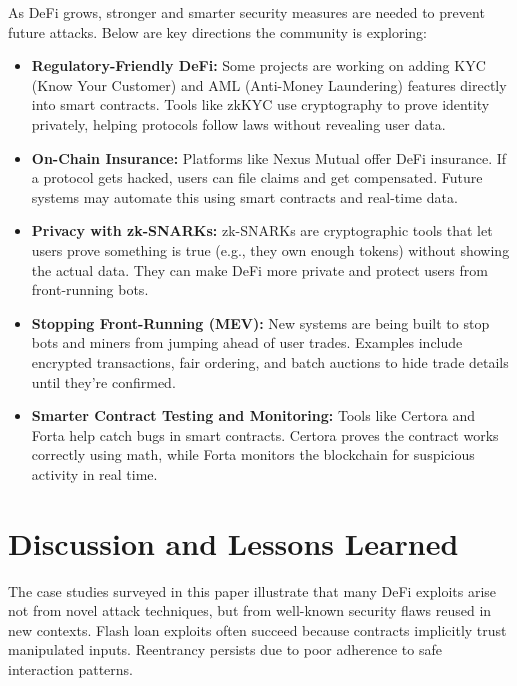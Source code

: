 \documentclass[conference]{IEEEtran}
\begin{document}
As DeFi grows, stronger and smarter security measures are needed to prevent future attacks. Below are key directions the community is exploring:

\begin{itemize}
  \item \textbf{Regulatory-Friendly DeFi:}  
  Some projects are working on adding KYC (Know Your Customer) and AML (Anti-Money Laundering) features directly into smart contracts. Tools like zkKYC use cryptography to prove identity privately, helping protocols follow laws without revealing user data.

  \item \textbf{On-Chain Insurance:}  
  Platforms like Nexus Mutual offer DeFi insurance. If a protocol gets hacked, users can file claims and get compensated. Future systems may automate this using smart contracts and real-time data.

  \item \textbf{Privacy with zk-SNARKs:}  
  zk-SNARKs are cryptographic tools that let users prove something is true (e.g., they own enough tokens) without showing the actual data. They can make DeFi more private and protect users from front-running bots.

  \item \textbf{Stopping Front-Running (MEV):}  
  New systems are being built to stop bots and miners from jumping ahead of user trades. Examples include encrypted transactions, fair ordering, and batch auctions to hide trade details until they’re confirmed.

  \item \textbf{Smarter Contract Testing and Monitoring:}  
  Tools like Certora and Forta help catch bugs in smart contracts. Certora proves the contract works correctly using math, while Forta monitors the blockchain for suspicious activity in real time.
\end{itemize}


\section{Discussion and Lessons Learned}

The case studies surveyed in this paper illustrate that many DeFi exploits arise not from novel attack techniques, but from well-known security flaws reused in new contexts. Flash loan exploits often succeed because contracts implicitly trust manipulated inputs. Reentrancy persists due to poor adherence to safe interaction patterns.
\end{document}

